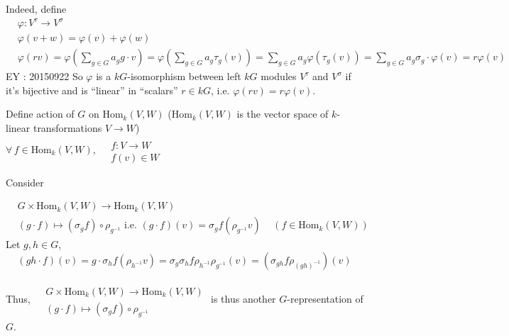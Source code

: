 \documentclass[10pt]{amsart}
\begin{document}
\begin{multicols*}{2}
Indeed, define 
\[
\begin{aligned}
& \varphi: V^{\tau} \to V^{\sigma} \\ 
& \varphi(v+w) = \varphi(v) + \varphi(w) \\ 
& \varphi(rv) = \varphi( \sum_{g\in G} a_g g \cdot v) = \varphi( \sum_{g \in G} a_g \tau_g(v) ) = \sum_{ g\in G} a_g \varphi(\tau_g(v)) = \sum_{g\in G} a_g \sigma_g \cdot \varphi(v) = r\varphi(v)
\end{aligned}
\]
EY : 20150922 So $\varphi$ is a $kG$-isomorphism between left $kG$ modules $V^{\tau}$ and $V^{\sigma}$ if it's bijective and is ``linear'' in ``scalars'' $r\in kG$, i.e. $\varphi(rv) = r\varphi(v)$.  

Define action of $G$ on $\text{Hom}_k(V,W)$ ($\text{Hom}_k(V,W)$ is the vector space of $k$-linear transformations $V\to W$) \\
$\forall \, f \in \text{Hom}_k(V,W)$, $\begin{aligned} & \quad \\
& f : V \to W \\
& f(v) \in W \end{aligned}$ \quad \, 

Consider

\[
\begin{aligned}
& G \times \text{Hom}_k(V,W) \to \text{Hom}_k(V,W) \\ 
& (g\cdot f) \mapsto (\sigma_g f) \circ \rho_{g^{-1}} \text{ i.e. } (g\cdot f)(v) = \sigma_gf(\rho_{g^{-1}}v) \quad \, (f\in \text{Hom}_k(V,W))
\end{aligned}
\]
Let $g,h \in G$, 
\[
(gh \cdot f)(v) = g\cdot \sigma_h f(\rho_{h^{-1}}v) = \sigma_g\sigma_h f\rho_{h^{-1}} \rho_{g^{-1}}(v) = (\sigma_{gh} f \rho_{(gh)^{-1}} )(v)
\]

Thus,  $\begin{aligned} & \quad \\
& G \times \text{Hom}_k(V,W) \to \text{Hom}_k(V,W) \\ 
& (g\cdot f) \mapsto (\sigma_g f)\circ \rho_{g^{-1}} \end{aligned}$ is thus another $G$-representation of $G$.  


\end{multicols*}
\end{document}
